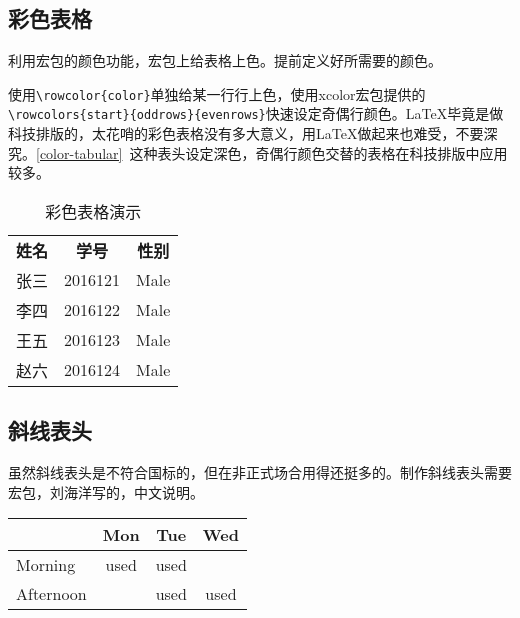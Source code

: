\subsection{彩色表格}

利用宏包的颜色功能，宏包上给表格上色。提前定义好所需要的颜色。

\begin{latex}
\end{latex}

使用\lstinline|\rowcolor{color}|单独给某一行行上色，使用xcolor宏包提供的\lstinline|\rowcolors{start}{oddrows}{evenrows}|快速设定奇偶行颜色。\LaTeX{}毕竟是做科技排版的，太花哨的彩色表格没有多大意义，用\LaTeX{}做起来也难受，不要深究。\autoref{color-tabular}~这种表头设定深色，奇偶行颜色交替的表格在科技排版中应用较多。

\begin{table}[!htb]
    \centering
    \caption{彩色表格演示}
    \label{color-tabular}
    \begin{tabular}{ccc}
        \rowcolor{header}
        \color{white} \textbf{姓名} &\color{white} \textbf{学号} &\color{white} \textbf{性别}\\
        张三 & 2016121 & Male\\
        李四 & 2016122 & Male\\
        王五 & 2016123 & Male\\
        赵六 & 2016124 & Male\\
    \end{tabular}
\end{table}

\subsection{斜线表头}

虽然斜线表头是不符合国标的，但在非正式场合用得还挺多的。制作斜线表头需要宏包，刘海洋写的，中文说明。

\begin{codeshow}
\centering
\begin{tabular}{|l|ccc|}
    \hline
    \diagbox{Time}{Room}{Day}
        &Mon&Tue&Wed\\
    \hline
    Morning&used&used&\\
    Afternoon& &used&used\\
    \hline
\end{tabular}
\end{codeshow}


